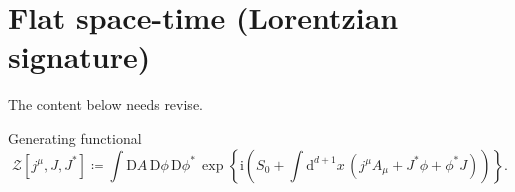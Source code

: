 \documentclass[12pt]{article}
\newcommand\mi{\mathrm{i}} %
\newcommand\dif{\mathrm{d}}
\newcommand\Dif{\mathrm{D}}
\newcommand{\rbr}[1]{{\left(#1\right)}}
\newcommand{\sfun}[2]{{#1}\mathopen{}\left[#2\right]\mathclose{}}
\newcommand{\cfun}[2]{{#1}\mathopen{}\left\{#2\right\}\mathclose{}}
\begin{document}

\cite{Dunne2005}




\section{Flat space-time (Lorentzian signature)}


The content below needs revise.

Generating functional
\begin{equation}
\sfun{\mathcal{Z}}{j^\mu, J, J^*} \coloneqq
\int\Dif A\,\Dif\phi\,\Dif\phi^*\,\cfun{\exp}{\mi\rbr{S_0
+\int\dif^{d+1} x\,\rbr{j^\mu A_\mu + J^* \phi+\phi^* J}}}.
\end{equation}
\end{document}
